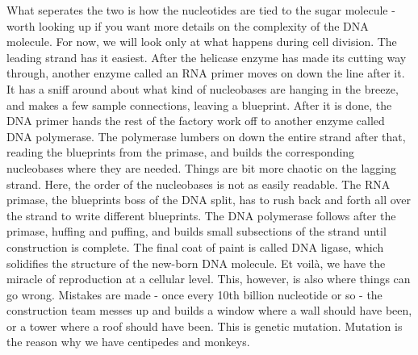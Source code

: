 What seperates the two is how the nucleotides are tied to the sugar molecule - worth looking up if you want more details on the complexity of the DNA molecule.
For now, we will look only at what happens during cell division.
The leading strand has it easiest.
After the helicase enzyme has made its cutting way through, another enzyme called an RNA primer moves on down the line after it.
It has a sniff around about what kind of nucleobases are hanging in the breeze, and makes a few sample connections, leaving a blueprint.
After it is done, the DNA primer hands the rest of the factory work off to another enzyme called DNA polymerase.
The polymerase lumbers on down the entire strand after that, reading the blueprints from the primase, and builds the corresponding nucleobases where they are needed. 
Things are bit more chaotic on the lagging strand.
Here, the order of the nucleobases is not as easily readable.
The RNA primase, the blueprints boss of the DNA split, has to rush back and forth all over the strand to write different blueprints.
The DNA polymerase follows after the primase, huffing and puffing, and builds small subsections of the strand until construction is complete.
The final coat of paint is called DNA ligase, which solidifies the structure of the new-born DNA molecule.
Et voilà, we have the miracle of reproduction at a cellular level.
This, however, is also where things can go wrong.
Mistakes are made - once every 10th billion nucleotide or so - the construction team messes up and builds a window where a wall should have been, or a tower where a roof should have been.
This is genetic mutation.
Mutation is the reason why we have centipedes and monkeys.